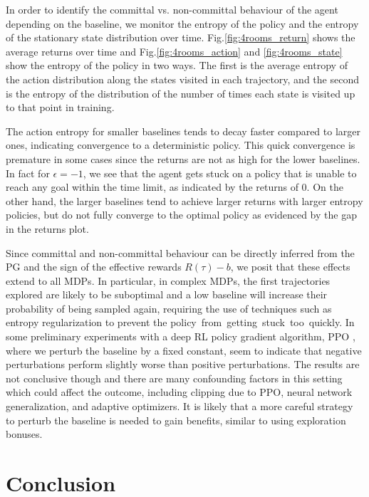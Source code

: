 In order to identify the committal vs. non-committal behaviour of the agent depending on the baseline, we monitor the entropy of the policy and the entropy of the stationary state distribution over time.
Fig.\ref{fig:4rooms_return} shows the average returns over time and Fig.\ref{fig:4rooms_action} and \ref{fig:4rooms_state} show the entropy of the policy in two ways. The first is the average entropy of the action distribution along the states visited in each trajectory, and the second is the entropy of the distribution of the number of times each state is visited up to that point in training.

The action entropy for smaller baselines tends to decay faster compared to larger ones, indicating convergence to a deterministic policy. This quick convergence is premature in some cases since the returns are not as high for the lower baselines.
In fact for $\epsilon=-1$, we see that the agent gets stuck on a policy that is unable to reach any goal within the time limit, as indicated by the returns of $0$.  
On the other hand, the larger baselines tend to achieve larger returns with larger entropy policies, but do not fully converge to the optimal policy as evidenced by the gap in the returns plot. 



Since committal and non-committal behaviour can be directly inferred from the PG and the sign of the effective rewards $R(\tau) - b$, we posit that these effects extend to all MDPs.
In particular, in complex MDPs, the first trajectories explored are likely to be suboptimal and a low baseline will increase their probability of being sampled again, requiring the use of techniques such as entropy regularization to prevent the policy~from~getting~stuck~too~quickly. 
In some preliminary experiments with a deep RL policy gradient algorithm, PPO \cite{schulman2017proximal}, where we perturb the baseline by a fixed constant, seem to indicate that negative perturbations perform slightly worse than positive perturbations. The results are not conclusive though and there are many confounding factors in this setting which could affect the outcome, including clipping due to PPO, neural network generalization, and adaptive optimizers. It is likely that a more careful strategy to perturb the baseline is needed to gain benefits, similar to using exploration bonuses. 

\section{Conclusion} 

